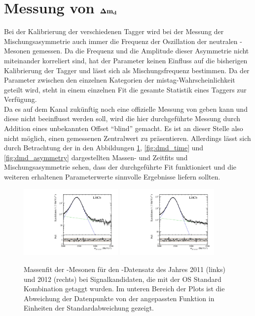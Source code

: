\section[head={Messung von $\dmd$},tocentry={Messung von $\dmd$}]{Messung von $\mathbf{{\Delta m_{{d}}}}$}

Bei der Kalibrierung der verschiedenen Tagger wird bei der Messung der Mischungsasymmetrie auch immer die Frequenz \dmd der Oszillation der neutralen \Bz-Mesonen gemessen. Da die Frequenz und die Amplitude dieser Asymmetrie nicht miteinander korreliert sind, hat der Parameter \dmd keinen Einfluss auf die bisherigen Kalibrierung der Tagger und lässt sich als Mischungsfrequenz bestimmen. Da der Parameter \dmd zwischen den einzelnen Kategorien der mistag-Wahrscheinlichkeit geteilt wird, steht in einem einzelnen Fit die gesamte Statistik eines Taggers zur Verfügung.\\
Da es auf dem Kanal \BdToDpi zukünftig noch eine offizielle Messung von \dmd geben kann und diese nicht beeinflusst werden soll, wird die hier durchgeführte Messung durch Addition eines unbekannten Offset \enquote{blind} gemacht. Es ist an dieser Stelle also nicht möglich, einen gemessenen Zentralwert zu präsentieren. Allerdings lässt sich durch Betrachtung der in den Abbildungen \ref{fig:dmd_mass}, \ref{fig:dmd_time} und \ref{fig:dmd_asymmetry} dargestellten Massen- und Zeitfits und Mischungsasymmetrie sehen, dass der durchgeführte Fit funktioniert und die weiteren erhaltenen Parameterwerte sinnvolle Ergebnisse liefern sollten. 
\begin{figure}[htbp]
	\centering
		\includegraphics[width=0.45\textwidth]{fig/mass_OS_2011.pdf}
		\includegraphics[width=0.45\textwidth]{fig/mass_OS_2012.pdf}
	\caption{Massenfit der \Bz-Mesonen für den \lhcb-Datensatz des Jahres \num{2011} (links) und \num{2012} (rechts) bei Signalkandidaten, die mit der OS Standard Kombination getaggt wurden. Im unteren Bereich der Plots ist die Abweichung der Datenpunkte von der angepassten Funktion in Einheiten der Standardabweichung gezeigt.}
	\label{fig:dmd_mass} 
\end{figure}
